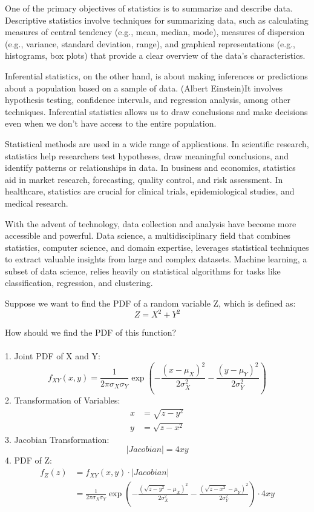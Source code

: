 \documentclass{article}
\begin{document}
One of the primary objectives of statistics is to summarize and describe data. Descriptive statistics involve techniques for summarizing data, such as calculating measures of central tendency (e.g., mean, median, mode), measures of dispersion (e.g., variance, standard deviation, range), and graphical representations (e.g., histograms, box plots) that provide a clear overview of the data's characteristics.

Inferential statistics, on the other hand, is about making inferences or predictions about a population based on a sample of data. (Albert Einstein)It involves hypothesis testing, confidence intervals, and regression analysis, among other techniques. Inferential statistics allows us to draw conclusions and make decisions even when we don't have access to the entire population.

Statistical methods are used in a wide range of applications. In scientific research, statistics help researchers test hypotheses, draw meaningful conclusions, and identify patterns or relationships in data. In business and economics, statistics aid in market research, forecasting, quality control, and risk assessment. In healthcare, statistics are crucial for clinical trials, epidemiological studies, and medical research.\citep{knuth1984}

With the advent of technology, data collection and analysis have become more accessible and powerful. Data science, a multidisciplinary field that combines statistics, computer science, and domain expertise, leverages statistical techniques to extract valuable insights from large and complex datasets. Machine learning, a subset of data science, relies heavily on statistical algorithms for tasks like classification, regression, and clustering.

Suppose we want to find the PDF of a random variable Z, which is defined as:
    \begin{equation}
        Z=X^2+Y^2
    \end{equation}
    
How should we find the PDF of this function?\\\\
1. Joint PDF of X and Y:
\begin{equation}
f_{XY}(x, y) = \frac{1}{2\pi\sigma_X\sigma_Y} \exp\left(-\frac{(x-\mu_X)^2}{2\sigma_X^2} - \frac{(y-\mu_Y)^2}{2\sigma_Y^2}\right)
\end{equation}
2. Transformation of Variables:
\begin{align}
x &= \sqrt{z - y^2} \\
y &= \sqrt{z - x^2}
\end{align}
3. Jacobian Transformation:
\begin{equation}
\left|Jacobian\right| = 4xy
\end{equation}
4. PDF of Z:
\begin{align}
f_Z(z) &= f_{XY}(x, y) \cdot \left|Jacobian\right| \\
&= \frac{1}{2\pi\sigma_X\sigma_Y} \exp\left(-\frac{(\sqrt{z - y^2}-\mu_X)^2}{2\sigma_X^2} - \frac{(\sqrt{z - x^2}-\mu_Y)^2}{2\sigma_Y^2}\right) \cdot 4xy
\end{align}
\end{document}
